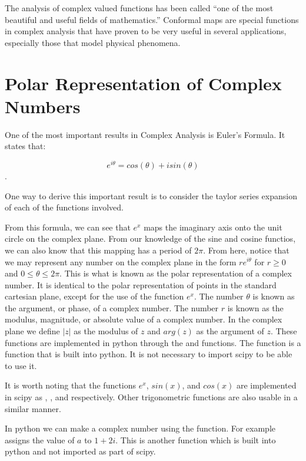 

The analysis of complex valued functions has been called ``one of the most beautiful and useful fields of mathematics.''  Conformal maps are special functions in complex analysis that have proven to be very useful in several applications, especially those that model physical phenomena.

\section*{Polar Representation of Complex Numbers}

One of the most important results in Complex Analysis is Euler's Formula. It states that:

$$e^{i\theta}=cos(\theta)+i sin(\theta)$$.

One way to derive this important result is to consider the taylor series expansion of each of the functions involved.

From this formula, we can see that $e^x$ maps the imaginary axis onto the unit circle on the complex plane. From our knowledge of the sine and cosine functios, we can also know that this mapping has a period of $2\pi$. From here, notice that we may represent any number on the complex plane in the form $r e^{i\theta}$ for $r\geq 0$ and $0 \leq \theta \leq 2\pi$. This is what is known as the polar representation of a complex number. It is identical to the polar representation of points in the standard cartesian plane, except for the use of the function $e^x$. The number $\theta$ is known as the argument, or phase, of a complex number. The number $r$ is known as the modulus, magnitude, or absolute value of a complex number. In the complex plane we define $|z|$ as the modulus of $z$ and $arg(z)$ as the argument of $z$. These functions are implemented in python through the  and  functions. The function  is a function that is built into python. It is not necessary to import scipy to be able to use it.

It is worth noting that the functions $e^x$, $sin(x)$, and $cos(x)$ are implemented in scipy as , , and  respectively. Other trigonometric functions are also usable in a similar manner.

In python we can make a complex number using the  function. For example  assigns the value of $a$ to $1+2i$. This is another function which is built into python and not imported as part of scipy.

